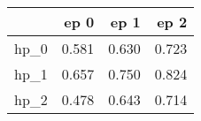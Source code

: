 \begin{tabular}{lrrr}
\toprule
{} &   ep 0 &   ep 1 &   ep 2 \\
\midrule
hp\_0 &  0.581 &  0.630 &  0.723 \\
hp\_1 &  0.657 &  0.750 &  0.824 \\
hp\_2 &  0.478 &  0.643 &  0.714 \\
\bottomrule
\end{tabular}
